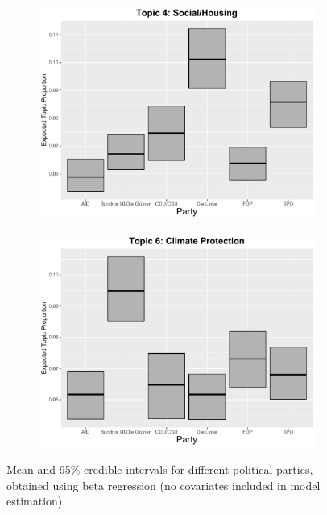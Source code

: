 \begin{figure}[h!]
  \centering
  \begin{subfigure}[b]{0.4\linewidth}
    \includegraphics[width=\linewidth]{../plots/appendix/6_1/beta_t4_cat_ctm.pdf}
  \end{subfigure}
  \begin{subfigure}[b]{0.4\linewidth}
    \includegraphics[width=\linewidth]{../plots/appendix/6_1/beta_t6_cat_ctm.pdf}
  \end{subfigure}
  \caption{Mean and 95\% credible intervals for different political parties, obtained using beta regression (no covariates included in model estimation).}
  \label{fig:beta_t46_cat_ctm}
\end{figure}

